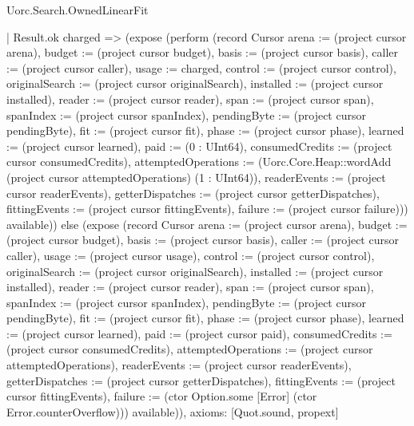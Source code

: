 \begin{lexlean}{Uorc.Search.OwnedLinearFit}
\begin{semanticmodule}
{    | Result.ok charged => (expose (perform (record Cursor {arena := (project cursor arena), budget := (project cursor budget), basis := (project cursor basis), caller := (project cursor caller), usage := charged, control := (project cursor control), originalSearch := (project cursor originalSearch), installed := (project cursor installed), reader := (project cursor reader), span := (project cursor span), spanIndex := (project cursor spanIndex), pendingByte := (project cursor pendingByte), fit := (project cursor fit), phase := (project cursor phase), learned := (project cursor learned), paid := (0 : UInt64), consumedCredits := (project cursor consumedCredits), attemptedOperations := (Uorc.Core.Heap::wordAdd (project cursor attemptedOperations) (1 : UInt64)), readerEvents := (project cursor readerEvents), getterDispatches := (project cursor getterDispatches), fittingEvents := (project cursor fittingEvents), failure := (project cursor failure)})) available)) else (expose (record Cursor {arena := (project cursor arena), budget := (project cursor budget), basis := (project cursor basis), caller := (project cursor caller), usage := (project cursor usage), control := (project cursor control), originalSearch := (project cursor originalSearch), installed := (project cursor installed), reader := (project cursor reader), span := (project cursor span), spanIndex := (project cursor spanIndex), pendingByte := (project cursor pendingByte), fit := (project cursor fit), phase := (project cursor phase), learned := (project cursor learned), paid := (project cursor paid), consumedCredits := (project cursor consumedCredits), attemptedOperations := (project cursor attemptedOperations), readerEvents := (project cursor readerEvents), getterDispatches := (project cursor getterDispatches), fittingEvents := (project cursor fittingEvents), failure := (ctor Option.some [Error] (ctor Error.counterOverflow))}) available)),
  axioms: [Quot.sound, propext]
}


\end{semanticmodule}
\end{lexlean}
